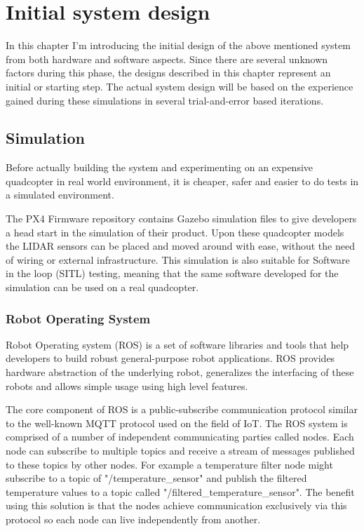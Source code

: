 \chapter{Initial system design}
In this chapter I'm introducing the initial design of the above mentioned system from both hardware and
software aspects. Since there are several unknown factors 
during this phase, the designs described in this chapter represent an initial or starting step. The actual
system design will be based on the experience gained during these simulations in several trial-and-error 
based iterations.



\section{Simulation}
Before actually building the system and experimenting on an expensive quadcopter in real world environment,
it is cheaper, safer and easier to do tests in a simulated environment. 

The PX4 Firmware repository\cite{PX4Repository} contains Gazebo simulation files to give developers a head 
start in the simulation of their product. Upon these quadcopter models the LIDAR sensors can be placed and 
moved around with ease, without the need of wiring or external infrastructure. This simulation is also 
suitable for Software in the loop (SITL) testing, meaning that the same software developed for the simulation
can be used on a real quadcopter. 

\subsection{Robot Operating System}
Robot Operating system (ROS) is a set of software libraries and tools that help developers to build robust 
general-purpose robot applications\cite{ROSWebsite}. ROS provides hardware abstraction of the underlying 
robot, generalizes the interfacing of these robots and allows simple usage using high level features.


The core component of ROS is a public-subscribe communication protocol similar to the well-known MQTT protocol
used on the field of IoT. The ROS system is comprised of a number of independent communicating parties called 
nodes. Each node can subscribe to multiple topics and receive a stream of messages published to these topics 
by other nodes. For example a temperature filter node might subscribe to a topic of "/temperature\_sensor" 
and publish the filtered temperature values to a topic called "/filtered\_temperature\_sensor". 
The benefit using this solution is that the nodes achieve communication exclusively via this protocol 
so each node can live independently from another.

